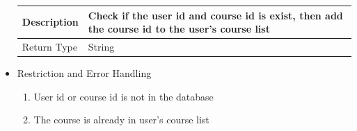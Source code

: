 \documentclass[16pt]{scrreprt}
\begin{document}
\begin{itemize}
\begin{center}
\begin{tabular}{p{5cm}p{10cm}}
        Description & Check if the user id and course id is exist, then add the course id to the user's course list\\
        \hline
        Return Type & String\\
        \hline
    \end{tabular}
\end{center}
\item Restriction and Error Handling\\
\begin{enumerate}
    \item User id or course id is not in the database
    \item The course is already in user's course list
\end{enumerate} 
\end{itemize}
\end{document}
